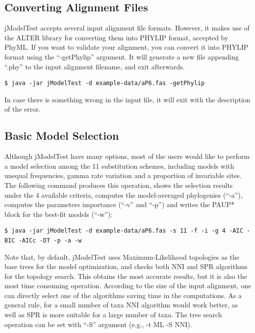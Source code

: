 \documentclass[11pt,twoside,a4paper]{article}
\begin{document}
\subsection{Converting Alignment Files}

jModelTest accepts several input alignment file formats. However, it makes use of the ALTER library for converting them into PHYLIP format, accepted by PhyML. If you want to validate your alignment, you can convert it into PHYLIP format using the ``-getPhylip'' argument. It will generate a new file appending ``.phy'' to the input alignment filename, and exit afterwards.

\begin{lstlisting}
$ java -jar jModelTest -d example-data/aP6.fas -getPhylip
\end{lstlisting}

In case there is something wrong in the input file, it will exit with the description of the error.

\subsection{Basic Model Selection}

Although jModelTest have many options, most of the users would like to perform a model selection among the 11 substitution schemes, including models with unequal frequencies, gamma rate variation and a proportion of invariable sites. The following command produces this operation, shows the selection results under the 4 available criteria, computes the model-averaged phylogenies (``-a''), computes the parameters importance (``-v'' and ``-p'') and writes the PAUP* block for the best-fit models (``-w''):

\begin{lstlisting}
$ java -jar jModelTest -d example-data/aP6.fas -s 11 -f -i -g 4 -AIC -BIC -AICc -DT -p -a -w
\end{lstlisting}

Note that, by default, jModelTest uses Maximum-Likelihood topologies as the base trees for the model optimization, and checks both NNI and SPR algorithms for the topology search. This obtains the most accurate results, but it is also the most time consuming operation. According to the size of the input alignment, one can directly select one of the algorithms saving time in the computations. As a general rule, for a small number of taxa NNI algorithm would work better, as well as SPR is more suitable for a large number of taxa. The tree search operation can be set with ``-S'' argument (e.g., -t ML -S NNI).
\end{document}
